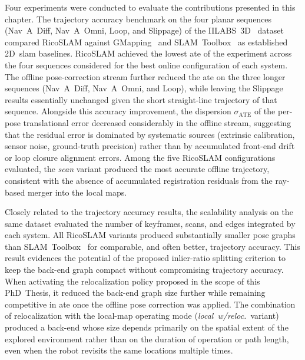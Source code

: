 Four experiments were conducted to evaluate the contributions presented
in this chapter. The trajectory accuracy benchmark on the four planar
sequences (Nav~A~Diff, Nav~A~Omni, Loop, and Slippage) of the
IILABS~3D~\cite{ribeiro:access:2025} dataset compared RicoSLAM against
GMapping~\cite{grisetti:tro:2007} and
SLAM~Toolbox~\cite{macenski-jambrecic:joss:2021} as established
2D~\gls{slam} baselines. RicoSLAM achieved the lowest \gls{ate} of the
experiment across the four sequences considered for the best online
configuration of each system. The offline pose-correction stream
further reduced the \gls{ate} on the three longer sequences
(Nav~A~Diff, Nav~A~Omni, and Loop), while leaving the Slippage
results essentially unchanged given the short straight-line trajectory of
that sequence. Alongside this accuracy improvement, the dispersion
$\sigma_{\mathrm{ATE}}$ of the per-pose translational error decreased
considerably in the offline stream, suggesting that the residual error is
dominated by systematic sources (extrinsic calibration, sensor noise,
ground-truth precision) rather than by accumulated front-end drift or loop closure alignment errors. Among
the five RicoSLAM configurations evaluated, the \emph{scan} variant
produced the most accurate offline trajectory, consistent with the
absence of accumulated registration residuals from the ray-based merger
into the local maps.

Closely related to the trajectory accuracy results, the scalability
analysis on the same dataset evaluated the number of keyframes, scans, and edges
integrated by each system. All RicoSLAM variants produced substantially smaller
pose graphs than SLAM~Toolbox~\cite{macenski-jambrecic:joss:2021} for
comparable, and often better, trajectory accuracy. This result
evidences the potential of the proposed inlier-ratio splitting criterion
to keep the back-end graph compact without compromising trajectory
accuracy. When activating the relocalization policy proposed in the scope of
this PhD~Thesis, it reduced the back-end graph size further while remaining
competitive in \gls{ate} once the offline pose correction was applied.
The combination of relocalization
with the local-map operating mode (\emph{local~w/reloc.}\ variant)
produced a back-end whose size depends primarily on the spatial extent of
the explored environment rather than on the duration of operation or
path length, even when the robot revisits the same locations multiple
times.


